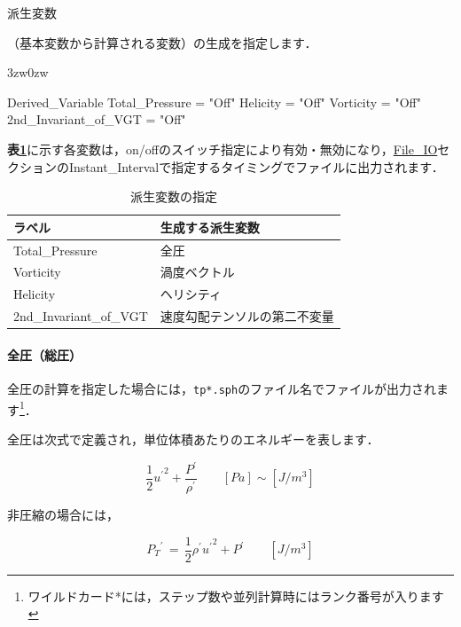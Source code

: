 \hypertarget{tgt:derived_variable}{派生変数}（基本変数から計算される変数）の生成を指定します．

\begin{indentation}{3zw}{0zw}

{\small
\begin{program}
  Derived_Variable {
    Total_Pressure       = "Off"
    Helicity             = "Off"
    Vorticity            = "Off"
    2nd_Invariant_of_VGT = "Off"
  }
\end{program}
}

\textbf{表\ref{tbl:derived vars}}に示す各変数は，on/offのスイッチ指定により有効・無効になり，\hyperlink{tgt:fileio}{File\_IO}セクションのInstant\_Intervalで指定するタイミングでファイルに出力されます．

\begin{table}[htdp]
\caption{派生変数の指定}
\begin{center}
\small
\begin{tabular}{ll}\toprule
ラベル & 生成する派生変数\\ \midrule
Total\_Pressure & 全圧\\
Vorticity & 渦度ベクトル\\
Helicity & ヘリシティ\\
2nd\_Invariant\_of\_VGT & 速度勾配テンソルの第二不変量\\ \bottomrule
\end{tabular}
\end{center}
\label{tbl:derived vars}
\end{table}

%
\paragraph{全圧（総圧）}
全圧の計算を指定した場合には，\verb|tp*.sph|のファイル名でファイルが出力されます\footnote{ワイルドカード*には，ステップ数や並列計算時にはランク番号が入ります}．


全圧は次式で定義され，単位体積あたりのエネルギーを表します．

\begin{equation}
\frac{1}{2} {u^{\prime}}^{2} + \frac{P^{\prime}}{\rho^{\prime}} \qquad [Pa] \sim [J/m^3]
\label{eq:total pressure}
\end{equation}

非圧縮の場合には，

\begin{equation}
{P_{T}}^{\prime} \,=\, \frac{1}{2} \rho^{\prime} {u^{\prime}}^{2} + P^{\prime} \qquad [J/m^3]
\label{eq:total pressure icmp}
\end{equation}


\end{indentation}
